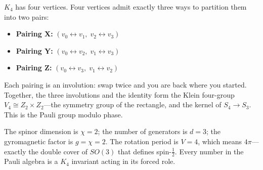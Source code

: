 \documentclass[11pt,a4paper]{book}
\def\mathbb#1{#1}%
\begin{document}
$K_4$ has four vertices. Four vertices admit exactly three ways to partition them into two pairs:
\begin{itemize}
  \item \textbf{Pairing X:} $(v_0 \leftrightarrow v_1,\; v_2 \leftrightarrow v_3)$
  \item \textbf{Pairing Y:} $(v_0 \leftrightarrow v_2,\; v_1 \leftrightarrow v_3)$
  \item \textbf{Pairing Z:} $(v_0 \leftrightarrow v_3,\; v_1 \leftrightarrow v_2)$
\end{itemize}

Each pairing is an involution: swap twice and you are back where you started. Together, the three involutions and the identity form the Klein four-group $V_4 \cong \mathbb{Z}_2 \times \mathbb{Z}_2$---the symmetry group of the rectangle, and the kernel of $S_4 \to S_3$. This is the Pauli group modulo phase.

The spinor dimension is $\chi = 2$; the number of generators is $d = 3$; the gyromagnetic factor is $g = \chi = 2$. The rotation period is $V = 4$, which means $4\pi$---exactly the double cover of $SO(3)$ that defines spin-$\frac{1}{2}$. Every number in the Pauli algebra is a $K_4$ invariant acting in its forced role.

\end{document}
